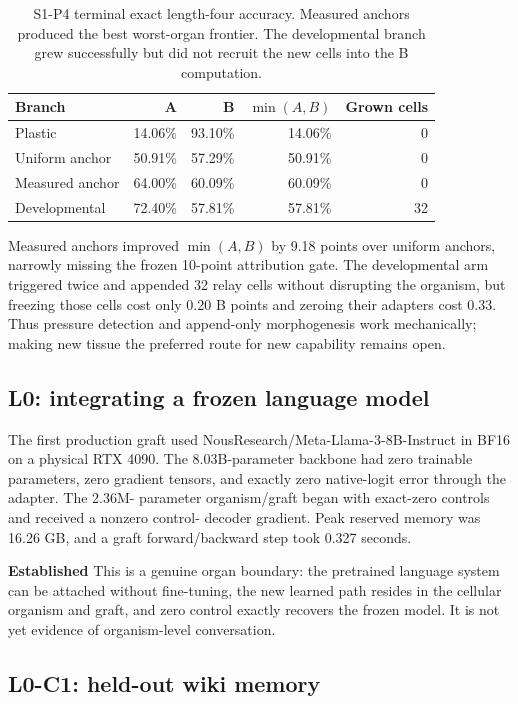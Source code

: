 \documentclass[11pt]{article}
\newcommand{\established}{\textcolor{DmonGreen}{\textbf{Established}}}
\begin{document}
\begin{table}[ht]
\centering
\small
\begin{tabular}{lrrrr}
\toprule
Branch & A & B & $\min(A,B)$ & Grown cells \\
\midrule
Plastic & 14.06\% & 93.10\% & 14.06\% & 0 \\
Uniform anchor & 50.91\% & 57.29\% & 50.91\% & 0 \\
Measured anchor & 64.00\% & 60.09\% & 60.09\% & 0 \\
Developmental & 72.40\% & 57.81\% & 57.81\% & 32 \\
\bottomrule
\end{tabular}
\caption{S1-P4 terminal exact length-four accuracy. Measured anchors produced the best
worst-organ frontier. The developmental branch grew successfully but did not recruit
the new cells into the B computation.}
\label{tab:s1p4}
\end{table}

Measured anchors improved $\min(A,B)$ by 9.18 points over uniform anchors, narrowly
missing the frozen 10-point attribution gate. The developmental arm triggered twice and
appended 32 relay cells without disrupting the organism, but freezing those cells cost
only 0.20 B points and zeroing their adapters cost 0.33. Thus pressure detection and
append-only morphogenesis work mechanically; making new tissue the preferred route for
new capability remains open.

\subsection{L0: integrating a frozen language model}

The first production graft used NousResearch/Meta-Llama-3-8B-Instruct in BF16 on a
physical RTX 4090. The 8.03B-parameter backbone had zero trainable parameters, zero
gradient tensors, and exactly zero native-logit error through the adapter. The 2.36M-
parameter organism/graft began with exact-zero controls and received a nonzero control-
decoder gradient. Peak reserved memory was 16.26 GB, and a graft forward/backward step
took 0.327 seconds.

\established{} This is a genuine organ boundary: the pretrained language system can be
attached without fine-tuning, the new learned path resides in the cellular organism and
graft, and zero control exactly recovers the frozen model. It is not yet evidence of
organism-level conversation.

\subsection{L0-C1: held-out wiki memory}
\end{document}
